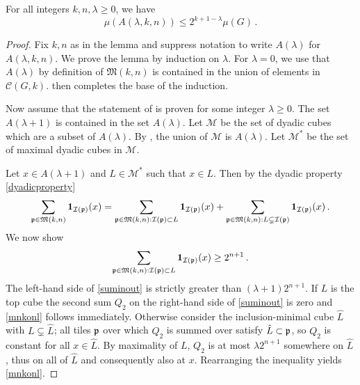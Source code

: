\begin{lemma}
\label{John-Nirenberg}
\leanok
{}
    For all integers $k,n,\lambda\ge 0$, we have
    \begin{equation}\label{alambdameasure}
        \mu(A(\lambda,k,n)) \le 2^{k+1-\lambda}\mu(G)\,.
    \end{equation}

\end{lemma}
\begin{proof}
\leanok
Fix $k,n$ as in the lemma
and suppress notation to write
$A(\lambda)$ for $A(\lambda,k,n)$.
We prove the lemma by induction on $\lambda$.
For $\lambda=0$, we use that $A(\lambda)$ by definition of $\mathfrak{M}(k,n)$ is contained in the union of elements in $ \mathcal{C}(G,k)$.  then completes the base of the induction.

Now assume that the statement of 
is proven for some integer $\lambda\ge 0$.
The set $A(\lambda+1)$ is contained in the set $A(\lambda)$.
Let $\mathcal{M}$ be the set of dyadic cubes which are a subset of $A(\lambda)$. By , the union of $\mathcal{M}$ is $A(\lambda)$.
Let $\mathcal{M}^*$ be the set of maximal dyadic cubes in $\mathcal{M}$.

Let $x\in A(\lambda+1)$ and $L\in \mathcal{M}^*$ such that $x\in L$. Then by the dyadic property \eqref{dyadicproperty}
\begin{equation}\label{suminout}
    \sum_{{\mathfrak p} \in {\mathfrak{M}}(k,n)} \mathbf{1}_{{\mathcal{I}}({\mathfrak p})}(x) =
    \sum_{{\mathfrak p} \in {\mathfrak{M}}(k,n):{\mathcal{I}}({\mathfrak p}) \subset L} \mathbf{1}_{{\mathcal{I}}({\mathfrak p})}(x) +
    \sum_{{\mathfrak p} \in {\mathfrak{M}}(k,n):L \subsetneq {\mathcal{I}}({\mathfrak p})} \mathbf{1}_{{\mathcal{I}}({\mathfrak p})}(x)\,.
\end{equation}
We now show
\begin{equation}\label{mnkonl}
    \sum_{{\mathfrak p} \in {\mathfrak{M}}(k,n):{\mathcal{I}}({\mathfrak p}) \subset L} \mathbf{1}_{{\mathcal{I}}({\mathfrak p})}(x)\ge 2^{n+1}\,.
\end{equation}
The left-hand side of \eqref{suminout} is strictly greater than $(\lambda+1)2^{n+1}$.
If $L$ is the top cube the second sum $Q_2$ on the right-hand side of \eqref{suminout} is zero and
\eqref{mnkonl} follows immediately. Otherwise consider the inclusion-minimal cube $\hat{L}$ with $L\subsetneq\hat{L}$;
all tiles ${\mathfrak p}$ over which $Q_2$ is summed over satisfy $\hat{L}\subset{\mathfrak p}$, so $Q_2$ is constant for all $x\in\hat{L}$.
By maximality of $L$, $Q_2$ is at most $\lambda 2^{n+1}$ somewhere on $\hat{L}$,
thus on all of $\hat{L}$ and consequently also at $x$. Rearranging the inequality yields \eqref{mnkonl}.


\end{proof}
